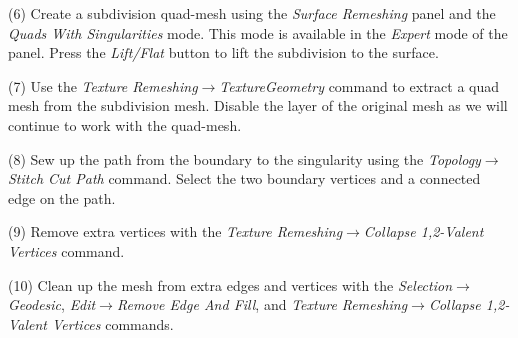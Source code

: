 \documentclass[Thesis.tex]{subfiles}
\begin{document}
\begin{compactenum}[(1)]
\begin{center}
\begin{minipage}{0.9\linewidth}
            \centering
\end{minipage}
\end{center}     
            
\item[(6)] Create a subdivision quad-mesh using the \emph{Surface Remeshing} panel and the \emph{Quads With Singularities} mode. This mode is available in the \emph{Expert} mode of the panel. Press the \emph{Lift/Flat} button to lift the subdivision to the surface.
\item[(7)] Use the \emph{Texture Remeshing$\to$TextureGeometry} command to extract a quad mesh from the subdivision mesh. Disable the layer of the original mesh as we will continue to work with the quad-mesh.

\begin{center}
\begin{minipage}{0.9\linewidth}
            \centering
            \label{fig:three-step-remeshing}
\end{minipage}
\end{center}                 
            
\item[(8)] Sew up the path from the boundary to the singularity using the \emph{Topology$\to$ Stitch Cut Path} command. Select the two boundary vertices and a connected edge on the path.
\item[(9)] Remove extra vertices with the \emph{Texture Remeshing$\to$Collapse 1,2-Valent Vertices} command.
\item[(10)] Clean up the mesh from extra edges and vertices with the \emph{Selection$\to$Geodesic}, \emph{Edit$\to$Remove Edge And Fill}, and \emph{Texture Remeshing$\to$Collapse 1,2-Valent Vertices} commands.


\end{compactenum}
\end{document}
